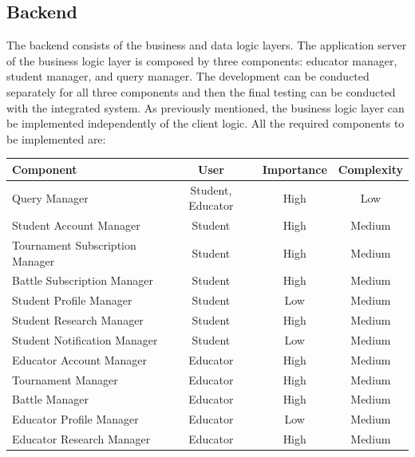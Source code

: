 \documentclass[12pt, a4paper]{report}
\begin{document}
    \subsection{Backend}
    The backend consists of the business and data logic layers. 
    The application server of the business logic layer is composed by three components: educator manager, student manager, and query manager. 
    The development can be conducted separately for all three components and then the final testing can be conducted with the integrated system. 
    As previously mentioned, the business logic layer can be implemented independently of the client logic. 
    All the required components to be implemented are: 
    \begin{table}[H]
        \begin{tabular}{lccc}
        \hline
        \textbf{Component}              & \textbf{User}     & \textbf{Importance} & \textbf{Complexity} \\ \hline
        Query Manager                   & Student, Educator & High                & Low                 \\
        Student Account Manager         & Student           & High                & Medium              \\
        Tournament Subscription Manager & Student           & High                & Medium              \\
        Battle Subscription Manager     & Student           & High                & Medium              \\
        Student Profile Manager         & Student           & Low                 & Medium              \\
        Student Research Manager        & Student           & High                & Medium              \\
        Student Notification Manager    & Student           & Low                 & Medium              \\
        Educator Account Manager        & Educator          & High                & Medium              \\
        Tournament Manager              & Educator          & High                & Medium              \\
        Battle Manager                  & Educator          & High                & Medium              \\
        Educator Profile Manager        & Educator          & Low                 & Medium              \\
        Educator Research Manager       & Educator          & High                & Medium              \\ \hline
        \end{tabular}
    \end{table}
\end{document}
